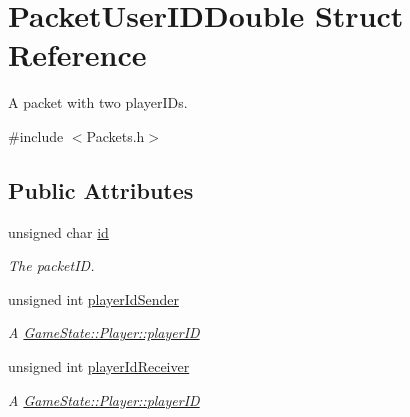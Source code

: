 \hypertarget{struct_packet_user_i_d_double}{\section{Packet\-User\-I\-D\-Double Struct Reference}
\label{struct_packet_user_i_d_double}
}


A packet with two player\-I\-Ds.  




{\ttfamily \#include $<$Packets.\-h$>$}

\subsection*{Public Attributes}
\begin{DoxyCompactItemize}
\item 
\hypertarget{struct_packet_user_i_d_double_aab2990fb8840c5bbbbaced392bea66f1}{unsigned char \hyperlink{struct_packet_user_i_d_double_aab2990fb8840c5bbbbaced392bea66f1}{id}}\label{struct_packet_user_i_d_double_aab2990fb8840c5bbbbaced392bea66f1}

\begin{DoxyCompactList}\small\item\em The packet\-I\-D. \end{DoxyCompactList}\item 
\hypertarget{struct_packet_user_i_d_double_aaa0532e70306102f0d275d2f6df1c3ff}{unsigned int \hyperlink{struct_packet_user_i_d_double_aaa0532e70306102f0d275d2f6df1c3ff}{player\-Id\-Sender}}\label{struct_packet_user_i_d_double_aaa0532e70306102f0d275d2f6df1c3ff}

\begin{DoxyCompactList}\small\item\em A \hyperlink{class_game_state_1_1_player_acbd28d89e6eb8611aa66452ec31e9133}{Game\-State\-::\-Player\-::player\-I\-D} \end{DoxyCompactList}\item 
\hypertarget{struct_packet_user_i_d_double_a92513f17c674d75301758a01dad58c55}{unsigned int \hyperlink{struct_packet_user_i_d_double_a92513f17c674d75301758a01dad58c55}{player\-Id\-Receiver}}\label{struct_packet_user_i_d_double_a92513f17c674d75301758a01dad58c55}

\begin{DoxyCompactList}\small\item\em A \hyperlink{class_game_state_1_1_player_acbd28d89e6eb8611aa66452ec31e9133}{Game\-State\-::\-Player\-::player\-I\-D} \end{DoxyCompactList}\end{DoxyCompactItemize}


